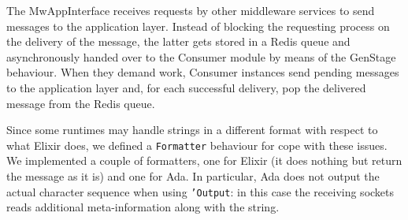 The MwAppInterface receives requests by other middleware services to send
messages to the application layer. Instead of blocking the requesting process on
the delivery of the message, the latter gets stored in a Redis queue and
asynchronously handed over to the Consumer module by means of the GenStage
behaviour. When they demand work, Consumer instances send pending messages to
the application layer and, for each successful delivery, pop the delivered
message from the Redis queue.

Since some runtimes may handle strings in a different format with respect to
what Elixir does, we defined a \texttt{Formatter} behaviour for cope with these
issues.
We implemented a couple of formatters, one for Elixir (it does nothing but
return the message as it is) and one for Ada. In particular, Ada does not
output the actual character sequence when using \texttt{'Output}: in this case
the receiving sockets reads additional meta-information along with the string.

